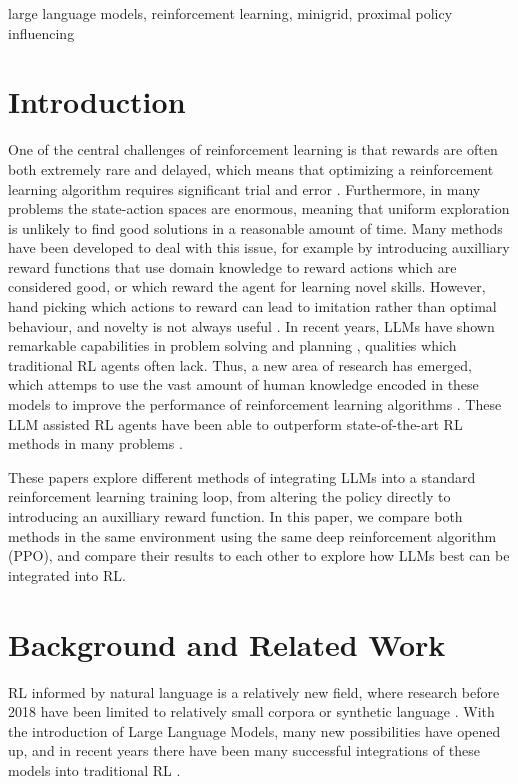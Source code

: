 \documentclass[conference]{IEEEtran}
\begin{document}
\begin{IEEEkeywords}
large language models, reinforcement learning, minigrid, proximal policy influencing
\end{IEEEkeywords}

\section{Introduction}

One of the central challenges of reinforcement learning is that rewards are often both extremely rare and delayed, which means that optimizing a reinforcement learning algorithm requires significant trial and error \cite[423]{brunton}. Furthermore, in many problems the state-action spaces are enormous, meaning that uniform exploration is unlikely to find good solutions in a reasonable amount of time. Many methods have been developed to deal with this issue, for example by introducing auxilliary reward functions that use domain knowledge to reward actions which are considered good, or which reward the agent for learning novel skills. However, hand picking which actions to reward can lead to imitation rather than optimal behaviour, and novelty is not always useful \cite[1]{ellm}. In recent years, LLMs have shown remarkable capabilities in problem solving and planning \cite{sparks}, qualities which traditional RL agents often lack. Thus, a new area of research has emerged, which attemps to use the vast amount of human knowledge encoded in these models to improve the performance of reinforcement learning algorithms \cite{survey}. These LLM assisted RL agents have been able to outperform state-of-the-art RL methods in many problems \cite{omni, ellm, idm}.

These papers explore different methods of integrating LLMs into a standard reinforcement learning training loop, from altering the policy directly to introducing an auxilliary reward function. In this paper, we compare both methods in the same environment using the same deep reinforcement algorithm (PPO), and compare their results to each other to explore how LLMs best can be integrated into RL.

\section{Background and Related Work}
\label{background}

RL informed by natural language is a relatively new field, where research before 2018 have been limited to relatively small corpora or synthetic language \cite[1]{survey}. With the introduction of Large Language Models, many new possibilities have opened up, and in recent years there have been many successful integrations of these models into traditional RL \cite{omni, ellm, idm}.
\end{document}
